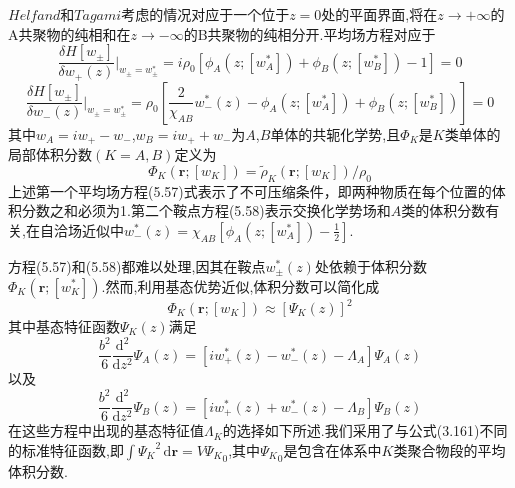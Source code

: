 $Helfand$和$Tagami$考虑的情况对应于一个位于$z=0$处的平面界面,将在$z\rightarrow +\infty$的A共聚物的纯相和在$z\rightarrow -\infty$的B共聚物的纯相分开.平均场方程对应于
\begin{equation}
{\frac{\delta H[w_\pm]}{\delta w_+(z)}}|_{w_\pm = w^*_\pm} = i\rho_0[\phi_A(z;[w^*_A])+\phi_B(z;[w^*_B])-1] = 0
\end{equation}
\begin{equation}
{\frac{\delta H[w_\pm]}{\delta w_-(z)}}|_{w_\pm = w^*_\pm} = \rho_0[\frac{2}{\chi_{AB}}w^*_-(z)-\phi_A(z;[w^*_A])+\phi_B(z;[w^*_B])]=0
\end{equation}
其中$w_A=iw_+ - w_-$,$w_B=iw_+ +w_-$为$A$,$B$单体的共轭化学势,且$\Phi_K$是$K$类单体的局部体积分数$(K=A,B)$定义为
\begin{equation}
\Phi_K(\mathbf{r};[w_K]) = \tilde{\rho}_K(\mathbf{r};[w_K])/\rho_0
\end{equation}
上述第一个平均场方程(5.57)式表示了不可压缩条件，即两种物质在每个位置的体积分数之和必须为1.第二个鞍点方程(5.58)表示交换化学势场和$A$类的体积分数有关,在自洽场近似中$w^*_-(z) = \chi_{AB}[\phi_A(z;[w^*_A])-\frac{1}{2}]$.

方程(5.57)和(5.58)都难以处理,因其在鞍点$w^*_\pm(z)$处依赖于体积分数$\Phi_K(\mathbf{r};[w^*_K])$.然而,利用基态优势近似,体积分数可以简化成
\begin{equation}
\Phi_K(\mathbf{r};[w_K]) \approx [\Psi_K(z)]^2
\end{equation}
其中基态特征函数$\Psi_K(z)$满足
\begin{equation}
\frac{b^{2}}{6}\frac{\mathrm{d}^{2}}{\mathrm{d} z^{2}} \Psi_{A}(z)=[iw_+^*(z)-w_-^*(z)-\Lambda_A]\Psi_{A}(z)
\end{equation}
以及
\begin{equation}
\frac{b^{2}}{6}\frac{\mathrm{d}^{2}}{\mathrm{d} z^{2}} \Psi_{B}(z)=[iw_+^*(z)+w_-^*(z)-\Lambda_B]\Psi_{B}(z)
\end{equation}
在这些方程中出现的基态特征值$\Lambda_K$的选择如下所述.我们采用了与公式(3.161)不同的标准特征函数,即$\int {\Psi_K}^2\,\mathrm{d}\mathbf{r}=V{\Psi_K}_0$,其中${\Psi_K}_0$是包含在体系中$K$类聚合物段的平均体积分数.

